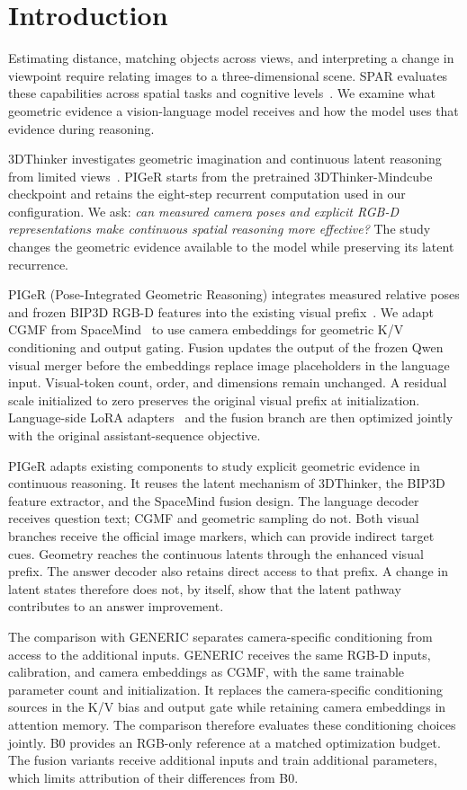 \section{Introduction}
\label{sec:intro}
Estimating distance, matching objects across views, and interpreting a change in viewpoint require relating images to a three-dimensional scene. SPAR evaluates these capabilities across spatial tasks and cognitive levels~\cite{spar}. We examine what geometric evidence a vision-language model receives and how the model uses that evidence during reasoning.

3DThinker investigates geometric imagination and continuous latent reasoning from limited views~\cite{thinker}. PIGeR starts from the pretrained 3DThinker-Mindcube checkpoint and retains the eight-step recurrent computation used in our configuration. We ask: \emph{can measured camera poses and explicit RGB-D representations make continuous spatial reasoning more effective?} The study changes the geometric evidence available to the model while preserving its latent recurrence.

PIGeR (Pose-Integrated Geometric Reasoning) integrates measured relative poses and frozen BIP3D RGB-D features into the existing visual prefix~\cite{bip3d}. We adapt CGMF from SpaceMind~\cite{spacemind} to use camera embeddings for geometric K/V conditioning and output gating. Fusion updates the output of the frozen Qwen visual merger before the embeddings replace image placeholders in the language input. Visual-token count, order, and dimensions remain unchanged. A residual scale initialized to zero preserves the original visual prefix at initialization. Language-side LoRA adapters~\cite{lora} and the fusion branch are then optimized jointly with the original assistant-sequence objective.

PIGeR adapts existing components to study explicit geometric evidence in continuous reasoning. It reuses the latent mechanism of 3DThinker, the BIP3D feature extractor, and the SpaceMind fusion design. The language decoder receives question text; CGMF and geometric sampling do not. Both visual branches receive the official image markers, which can provide indirect target cues. Geometry reaches the continuous latents through the enhanced visual prefix. The answer decoder also retains direct access to that prefix. A change in latent states therefore does not, by itself, show that the latent pathway contributes to an answer improvement.

The comparison with GENERIC separates camera-specific conditioning from access to the additional inputs. GENERIC receives the same RGB-D inputs, calibration, and camera embeddings as CGMF, with the same trainable parameter count and initialization. It replaces the camera-specific conditioning sources in the K/V bias and output gate while retaining camera embeddings in attention memory. The comparison therefore evaluates these conditioning choices jointly. B0 provides an RGB-only reference at a matched optimization budget. The fusion variants receive additional inputs and train additional parameters, which limits attribution of their differences from B0.


